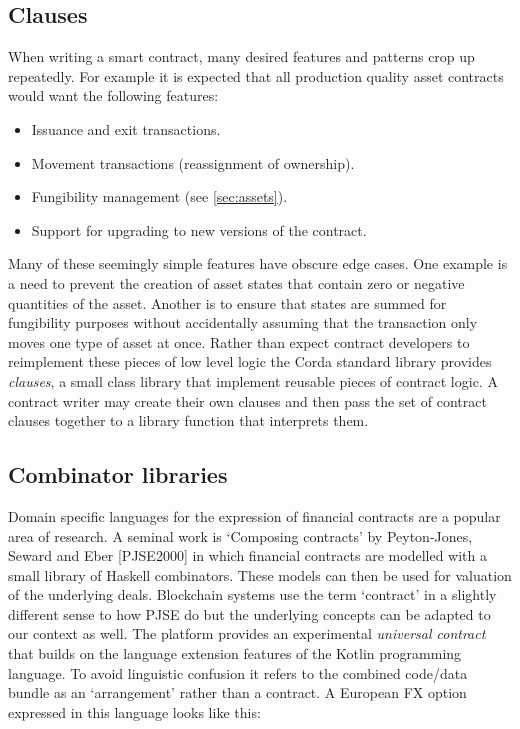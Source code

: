 \documentclass{article}
\begin{document}
\subsection{Clauses}
When writing a smart contract, many desired features and patterns crop up repeatedly. For example it is expected
that all production quality asset contracts would want the following features:

\begin{itemize}
\item Issuance and exit transactions.
\item Movement transactions (reassignment of ownership).
\item Fungibility management (see \cref{sec:assets}).
\item Support for upgrading to new versions of the contract.
\end{itemize}

Many of these seemingly simple features have obscure edge cases. One example is a need to prevent the creation of
asset states that contain zero or negative quantities of the asset. Another is to ensure that states are summed
for fungibility purposes without accidentally assuming that the transaction only moves one type of asset at once.
Rather than expect contract developers to reimplement these pieces of low level logic the Corda standard library
provides \emph{clauses}, a small class library that implement reusable pieces of contract logic. A contract writer
may create their own clauses and then pass the set of contract clauses together to a library function that
interprets them.

\subsection{Combinator libraries}

Domain specific languages for the expression of financial contracts are a popular area of research. A seminal work
is `Composing contracts' by Peyton-Jones, Seward and Eber [PJSE2000\cite{PeytonJones:2000:CCA:357766.351267}] in which
financial contracts are modelled with a small library of Haskell combinators. These models can then be used for
valuation of the underlying deals. Blockchain systems use the term `contract' in a slightly different sense to
how PJSE do but the underlying concepts can be adapted to our context as well. The platform provides an
experimental \emph{universal contract} that builds on the language extension features of the Kotlin programming
language. To avoid linguistic confusion it refers to the combined code/data bundle as an `arrangement' rather
than a contract. A European FX option expressed in this language looks like this:
\end{document}
